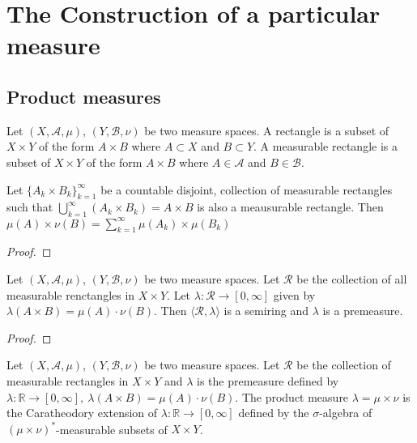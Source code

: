 
\setcounter{section}{19}
\section{The Construction of a particular measure}
\subsection{Product measures}

\begin{definition}
	Let $(X,\mathcal{A},\mu)$, $(Y,\mathcal{B},\nu)$ be two measure spaces.
	A rectangle is a subset of $X \times Y$ of the form $A \times B$ where $A \subset X$ and $B \subset Y$.
	A measurable rectangle is a subset of $X \times Y$ of the form $A \times B$ where $A \in \mathcal{A}$ and $B \in \mathcal{B}$.
\end{definition}
\begin{lemma}
	Let $\{ A_k \times B_k \}_{k=1}^\infty$ be a countable disjoint, collection of measurable rectangles such that $\displaystyle \bigcup_{k=1}^\infty \left( A_k \times B_k \right) = A \times B$ is also a meausurable rectangle.
	Then
	$\displaystyle \mu(A) \times \nu(B) = \sum_{k=1}^\infty \mu(A_k) \times \mu(B_k) $
\end{lemma}
\begin{proof}
\end{proof}


\begin{theorem}
	Let $(X,\mathcal{A},\mu)$, $(Y,\mathcal{B},\nu)$ be two measure spaces.
	Let $\mathcal{R}$ be the collection of all measurable renctangles in $X \times Y$.
	Let $\lambda : \mathcal{R} \to [0,\infty]$ given by $\lambda(A \times B) = \mu(A) \cdot \nu(B)$.
	Then $\langle \mathcal{R},\lambda \rangle$ is a semiring and $\lambda$ is a premeasure.
\end{theorem}
\begin{proof}
\end{proof}

\begin{definition}
	Let $(X,\mathcal{A},\mu)$, $(Y,\mathcal{B},\nu)$ be two measure spaces.
	Let $\mathcal{R}$ be the collection of measurable rectangles in $X \times Y$ and $\lambda$ is the premeasure defined by $\lambda : \mathbb{R} \to [0,\infty],\ \lambda(A \times B) = \mu(A) \cdot \nu(B)$.
	The product measure $\lambda = \mu \times \nu$ is the Caratheodory extension of $\lambda : \mathbb{R} \to [0,\infty]$ defined by the $\sigma$-algebra of $(\mu \times \nu)^\ast$-measurable subsets of $X \times Y$.
\end{definition}

